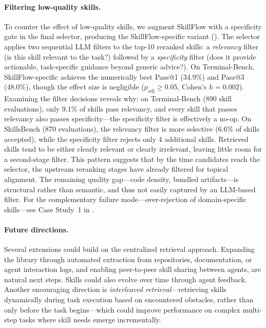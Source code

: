 \documentclass[11pt]{article}
\begin{document}
\paragraph{Filtering low-quality skills.}
To counter the effect of low-quality skills, we augment SkillFlow with a specificity gate in the final selector, producing the SkillFlow-specific variant ().
The selector applies two sequential LLM filters to the top-10 reranked skills: a \emph{relevancy} filter (is this skill relevant to the task?) followed by a \emph{specificity} filter (does it provide actionable, task-specific guidance beyond generic advice?).
On Terminal-Bench, SkillFlow-specific achieves the numerically best Pass@1 (34.9\%) and Pass@3 (48.0\%), though the effect size is negligible ($p_{\text{adj}} \geq 0.05$, Cohen's $h = 0.002$).
Examining the filter decisions reveals why: on Terminal-Bench (890 skill evaluations), only 9.1\% of skills pass relevancy, and every skill that passes relevancy also passes specificity---the specificity filter is effectively a no-op.
On SkillsBench (870 evaluations), the relevancy filter is more selective (6.6\% of skills accepted), while the specificity filter rejects only 4 additional skills.
Retrieved skills tend to be either clearly relevant or clearly irrelevant, leaving little room for a second-stage filter.
This pattern suggests that by the time candidates reach the selector, the upstream reranking stages have already filtered for topical alignment. The remaining quality gap---code density, bundled artifacts---is structural rather than semantic, and thus not easily captured by an LLM-based filter.
For the complementary failure mode---over-rejection of domain-specific skills---see Case Study~1 in .

\paragraph{Future directions.}
Several extensions could build on the centralized retrieval approach.
Expanding the library through automated extraction from repositories, documentation, or agent interaction logs, and enabling peer-to-peer skill sharing between agents, are natural next steps.
Skills could also evolve over time through agent feedback.
Another encouraging direction is \emph{interleaved retrieval}---retrieving skills dynamically during task execution based on encountered obstacles, rather than only before the task begins---which could improve performance on complex multi-step tasks where skill needs emerge incrementally.
\end{document}
